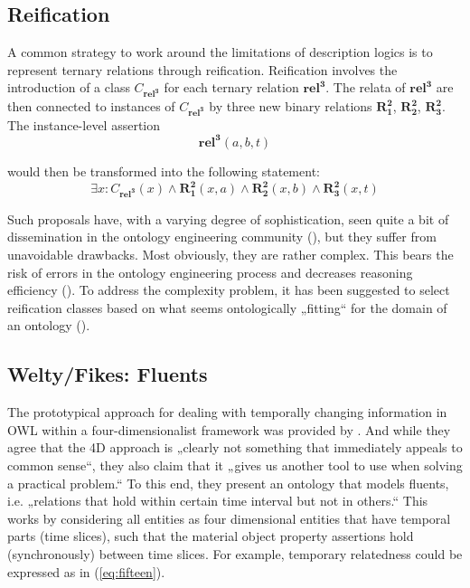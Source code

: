\documentclass[10pt]{bmc_article}
\newcommand{\mirel}[1]{\ensuremath{\mathrm{\mathbf{#1}}}}
\newcommand{\mclass}[1]{\ensuremath{\mathit{#1}}}
\newcommand{\mrel}[2]{\mirel{#1^#2}}
\newcommand{\mrelb}[1]{\mrel{#1}{2}}
\newcommand{\mrelt}[1]{\mrel{#1}{3}}
\newenvironment{bmcformat}{\baselineskip20pt\sloppy\setboolean{publ}{false}}{\baselineskip20pt\sloppy}
\begin{document}
\begin{bmcformat}
\subsection*{Reification}

A common strategy to work around the limitations of description logics is to
represent ternary relations through reification. Reification involves the
introduction of a class $\mclass{C_\mrelt{rel}}$ for each ternary relation
\mrelt{rel}. The relata of \mrelt{rel}
are then connected to instances of $\mclass{C_\mrelt{rel}}$ by three new binary
relations \mrelb{R_1}, \mrelb{R_2},
\mrelb{R_3}. The instance-level assertion
$$
\mrelt{rel}(a,b,t)
$$

would then be transformed into the following statement:
\begin{equation}
\exists x: \mclass{C_\mrelt{rel}}(x) \wedge
\mrelb{R_1}(x,a) \wedge
\mrelb{R_2}(x,b) \wedge
\mrelb{R_3}(x,t) 
\end{equation}

Such proposals have, with a varying degree of sophistication, seen quite a bit
of dissemination in the ontology engineering community (\cite{ODP:nary}), but they suffer
from unavoidable drawbacks. Most obviously, they are rather complex. This bears
the risk of errors in the ontology engineering process and decreases reasoning
efficiency (\cite{Grewe:2010}). To address the complexity problem, it has been suggested to
select reification classes based on what seems ontologically „fitting“ for the
domain of an ontology (\cite{Fiadeiro:2010}).

\subsection*{Welty/Fikes: Fluents}
The prototypical approach for dealing with temporally changing information in
OWL within a four-dimensionalist framework was provided by 
\cite{Welty:2006}. And while they agree that the 4D  approach is „clearly 
not something that immediately appeals to common sense“, they also claim
that it „gives us another tool to use when solving a practical problem.“ To this
end, they present an ontology that models fluents, i.e. „relations that hold
within certain time interval but not in others.“ This works by considering all
entities as four dimensional entities that have temporal parts (time slices),
such that the material object property assertions hold (synchronously) between
time slices. For example, temporary relatedness could be expressed as in
(\ref{eq:fifteen}).


\end{bmcformat}
\end{document}
